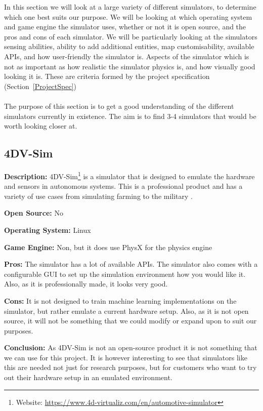 In this section we will look at a large variety of different simulators, to determine which one best suits our purpose. We will be looking at which operating system and game engine the simulator uses, whether or not it is open source, and the pros and cons of each simulator. We will be particularly looking at the simulators sensing abilities, ability to add additional entities, map customisability, available APIs, and how user-friendly the simulator is. Aspects of the simulator which is not as important as how realistic the simulator physics is, and how visually good looking it is. These are criteria formed by the project specification (Section~\ref{ProjectSpec})
\\~\\
The purpose of this section is to get a good understanding of the different simulators currently in existence. The aim is to find 3-4 simulators that would be worth looking closer at.

\subsection{4DV-Sim}
\textbf{Description:} 4DV-Sim\footnote{Website: \url{https://www.4d-virtualiz.com/en/automotive-simulator}} is a simulator that is designed to emulate the hardware and sensors in autonomous systems. This is a professional product and has a variety of use cases from simulating farming to the military \cite{4dv-simulator}.

\textbf{Open Source:} No

\textbf{Operating System:} Linux

\textbf{Game Engine:} Non, but it does use PhysX for the physics engine

\textbf{Pros:} The simulator has a lot of available APIs. The simulator also comes with a configurable GUI to set up the simulation environment how you would like it. Also, as it is professionally made, it looks very good.   

\textbf{Cons:} It is not designed to train machine learning implementations on the simulator, but rather emulate a current hardware setup. Also, as it is not open source, it will not be something that we could modify or expand upon to suit our purposes. 

\textbf{Conclusion:} As 4DV-Sim is not an open-source product it is not something that we can use for this project. It is however interesting to see that simulators like this are needed not just for research purposes, but for customers who want to try out their hardware setup in an emulated environment.


